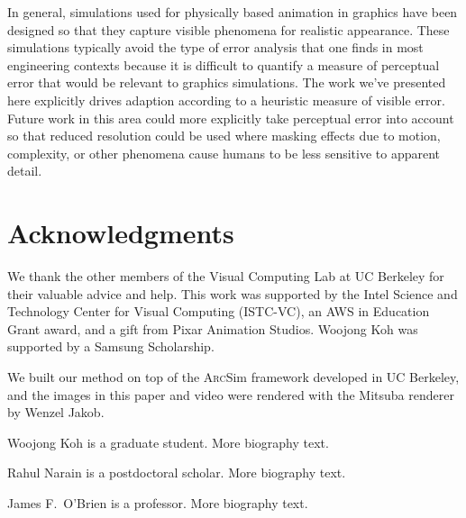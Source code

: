 \documentclass[10pt,journal,compsoc,twoside]{TexInputs/IEEEtran}
\newcommand{\arcsim}{\textsc{Arc}Sim\xspace}
\begin{document}
\vspace{.1in}

In general, simulations used for physically based animation in
graphics have been designed so that they capture visible phenomena for
realistic appearance.  These simulations typically avoid the type of
error analysis that one finds in most engineering contexts because it
is difficult to quantify a measure of perceptual error that would be
relevant to graphics simulations.  The work we've presented here
explicitly drives adaption according to a heuristic measure of visible
error.  Future work in this area could more explicitly
take perceptual error into account so that reduced resolution could be
used where masking effects due to motion, complexity, or other
phenomena cause humans to be less sensitive to apparent detail.



\section*{Acknowledgments}
We thank the other members of the Visual Computing Lab at UC Berkeley for their
valuable advice and help. This work was supported by the Intel Science and Technology
Center for Visual Computing (ISTC-VC), an AWS in Education Grant
award, and a gift from Pixar Animation Studios.  Woojong Koh was supported by a
Samsung Scholarship.

We built our method on top of the \arcsim framework developed in UC Berkeley, and the
images in this paper and video were rendered with the Mitsuba renderer by Wenzel Jakob.

\vspace*{.1in}





\begin{IEEEbiography}
{Woojong Koh}
is a graduate student. More biography text.
\end{IEEEbiography}

\begin{IEEEbiography}
{Rahul Narain}
is a postdoctoral scholar. More biography text.
\end{IEEEbiography}

\begin{IEEEbiography}
{James F.~O'Brien}
is a professor. More biography text.
\end{IEEEbiography}

\vfill
\end{document}
